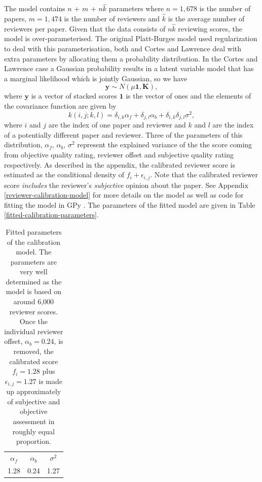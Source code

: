 \documentclass[twoside]{article}
\begin{document}
The model contains $n$ + $m$ + $n\hat{k}$ parameters where $n=1,678$
is the number of papers, $m=1,474$ is the number of reviewers and
$\hat{k}$ is the average number of reviewers per paper. Given that the
data consists of $n\hat{k}$ reviewing scores, the model is
over-parameterised. The original Platt-Burges model used
regularization to deal with this parameterisation, both
\cite{Ge-bayesian15} and Cortes and Lawrence deal with extra
parameters by allocating them a probability distribution. In the
Cortes and Lawrence case a Gaussian probability results in a latent
variable model that has a marginal likelihood which is jointly
Gaussian, so we have
$$
\mathbf{y} \sim N(\mu \mathbf{1}, \mathbf{K}),
$$
where $\mathbf{y}$ is a vector of stacked scores $\mathbf{1}$ is
the vector of ones and the elements of the covariance function are given
by
$$
k(i,j; k,l) = \delta_{i,k} \alpha_f + \delta_{j,l} \alpha_b + \delta_{i, k}\delta_{j,l} \sigma^2,
$$ where $i$ and $j$ are the index of one paper and reviewer and $k$
and $l$ are the index of a potentially different paper and
reviewer. Three of the parameters of this distribution, $\alpha_f$,
$\alpha_b$, $\sigma^2$ represent the explained variance of the the
score coming from objective quality rating, reviewer offset and
subjective quality rating respectively. As described in the appendix,
the calibrated reviewer score is estimated as the conditional density
of $f_i + \epsilon_{i,j}$. Note that the calibrated reviewer score
\emph{includes} the reviewer's \emph{subjective} opinion about the
paper. See Appendix \ref{reviewer-calibration-model} for more details
on the model as well as code for fitting the model in GPy
\cite{Gpy-20012}. The parameters of the fitted model are given in
Table \ref{fitted-calibration-parameters}.

\begin{table}[htb]
  \label{table-fitted-calibration-parameters}
  \caption{Fitted parameters of the calibration model. The parameters are very well determined as the model is based on around 6,000 reviewer scores. Once the individual reviewer offset, $\alpha_b=0.24$, is removed, the calibrated score $f_i = 1.28$ plus $\epsilon_{i,j}=1.27$ is made up approximately of subjective and objective assessment in roughly equal proportion.} 
  \begin{center}
  \begin{tabular}{ccc}
    $\alpha_f$ & $\alpha _b$ & $\sigma^2$ \\
    1.28 & 0.24 & 1.27
  \end{tabular}
  \end{center}
\end{table}  
\end{document}
